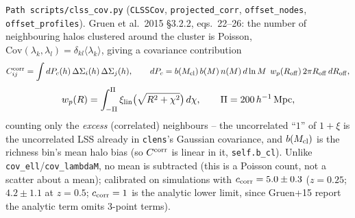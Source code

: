 \documentclass[a4paper, 11pt]{article}
\newcommand{\hMpc}{h^{-1}\,\mathrm{Mpc}}
\newcommand{\modname}[1]{\textcolor{kwcol}{\texttt{#1}}}
\newcommand{\pyfile}[1]{{\small\texttt{#1}}}
\begin{document}
\modname{Path}\ \pyfile{scripts/clss\_cov.py}
(\texttt{CLSSCov}, \texttt{projected\_corr}, \texttt{offset\_nodes},
\texttt{offset\_profiles}). Gruen et al.\ 2015 \S3.2.2, eqs.~22--26:
the number of neighbouring halos clustered around the cluster is
Poisson, $\mathrm{Cov}(\lambda_k,\lambda_l)=\delta_{kl}\langle
\lambda_k\rangle$, giving a covariance contribution
\begin{equation}
  C^{\rm corr}_{ij} = \int dP_c(h)\,\Delta\Sigma_i(h)\,\Delta\Sigma_j(h), \qquad
  dP_c = b(M_{\rm cl})\,b(M)\,n(M)\,d\ln M\;\, w_p(R_{\rm off})\,2\pi R_{\rm off}\,dR_{\rm off},
\end{equation}
\begin{equation}
  w_p(R) = \int_{-\Pi}^{\Pi}\xi_{\rm lin}\big(\sqrt{R^2+\chi^2}\big)\,d\chi,
  \qquad \Pi = 200\,\hMpc,
\end{equation}
counting only the \emph{excess} (correlated) neighbours -- the
uncorrelated ``$1$'' of $1+\xi$ is the uncorrelated LSS already in
\modname{clens}'s Gaussian covariance, and $b(M_{\rm cl})$ is the
richness bin's mean halo bias (so $C^{\rm corr}$ is linear in it,
\texttt{self.b\_cl}). Unlike \texttt{cov\_ell}/\texttt{cov\_lambdaM},
no mean is subtracted (this is a Poisson count, not a scatter about a
mean); calibrated on simulations with $c_{\rm corr}=5.0\pm0.3$
($z=0.25$; $4.2\pm1.1$ at $z=0.5$; $c_{\rm corr}=1$ is the analytic
lower limit, since Gruen+15 report the analytic term omits 3-point
terms).
\end{document}
